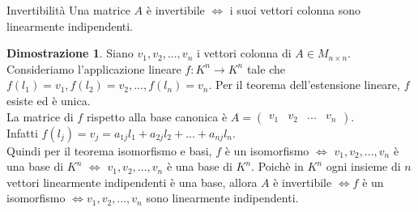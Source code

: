 \documentclass[a4paper]{article}
\theoremstyle{definition}
\newtheorem*{dimm}{Dimostrazione}
\begin{document}
\begin{teo}{Invertibilità}{}
	Una matrice $A$ è invertibile $\Leftrightarrow$ i suoi vettori colonna sono linearmente indipendenti.
\end{teo}
\begin{dimm}
	Siano $v_1, v_2, ..., v_n$ i vettori colonna di $A \in M_{n \times n}$.
	Consideriamo l'applicazione lineare $f: K^n \rightarrow K^n$ tale che $f(l_1) = v_1, f(l_2) = v_2, ..., f(l_n) = v_n$.
	Per il teorema dell'estensione lineare, $f$ esiste ed è unica. \\
	La matrice di $f$ rispetto alla base canonica è $A = \begin{pmatrix}
			v_1 & v_2 & ... & v_n
		\end{pmatrix}$. \\
	Infatti $f(l_j) = v_j = a_{1j}l_1 + a_{2j}l_2 + ... + a_{nj}l_n$. \\
	Quindi per il teorema isomorfismo e basi, $f$ è un isomorfismo $\Leftrightarrow$ $v_1, v_2, ..., v_n$ è una base di $K^n$ $\Leftrightarrow$ $v_1, v_2, ..., v_n$ è una base di $K^n$.
	Poichè in $K^n$ ogni insieme di $n$ vettori linearmente indipendenti è una base, allora $A$ è invertibile $\Leftrightarrow f$ è un isomorfismo $\Leftrightarrow v_1, v_2, ..., v_n$ sono linearmente indipendenti.
\end{dimm}
\end{document}
